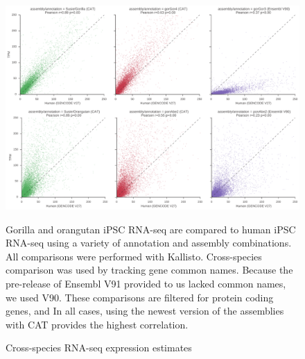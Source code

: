 \documentclass[fleqn,10pt]{wlscirep}
\begin{document}
\begin{figure}
\includegraphics[width=0.8\paperwidth,keepaspectratio]{orang-gorilla-cross-species.pdf}
\caption{Cross-species RNA-seq expression estimates}

Gorilla and orangutan iPSC RNA-seq are compared to human iPSC RNA-seq using a variety of annotation and assembly combinations. All comparisons were performed with Kallisto. Cross-species comparison was used by tracking gene common names. Because the pre-release of Ensembl V91 provided to us lacked common names, we used V90. These comparisons are filtered for protein coding genes, and In all cases, using the newest version of the assemblies with CAT provides the highest correlation.
\end{figure}
\end{document}
